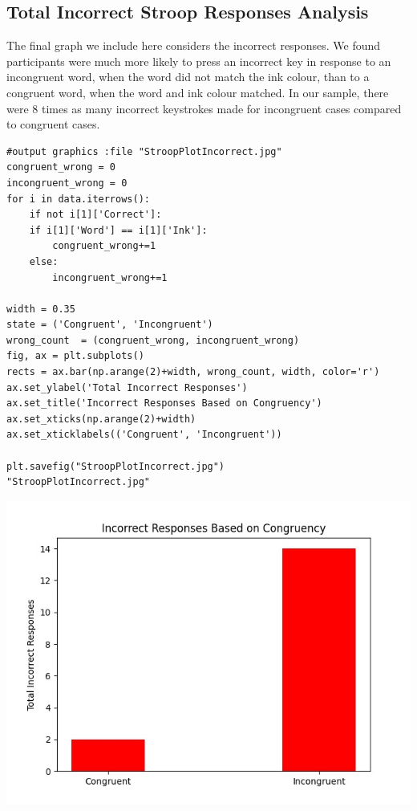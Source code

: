 \documentclass{article}
\begin{document}
\pagebreak


\subsection{Total Incorrect Stroop Responses Analysis}
\label{sec:org4ce073f}

The final graph we include here considers the incorrect responses. We found participants were much more likely to press an incorrect key in response to an incongruent word, when the word did not match the ink colour, than to a congruent word, when the word and ink colour matched. In our sample, there were 8 times as many incorrect keystrokes made for incongruent cases compared to congruent cases.

\begin{verbatim}
#output graphics :file "StroopPlotIncorrect.jpg"
congruent_wrong = 0
incongruent_wrong = 0
for i in data.iterrows():
    if not i[1]['Correct']:
	if i[1]['Word'] == i[1]['Ink']:
	    congruent_wrong+=1
	else:
	    incongruent_wrong+=1

width = 0.35
state = ('Congruent', 'Incongruent')
wrong_count  = (congruent_wrong, incongruent_wrong)
fig, ax = plt.subplots()
rects = ax.bar(np.arange(2)+width, wrong_count, width, color='r')
ax.set_ylabel('Total Incorrect Responses')
ax.set_title('Incorrect Responses Based on Congruency')
ax.set_xticks(np.arange(2)+width)
ax.set_xticklabels(('Congruent', 'Incongruent'))

plt.savefig("StroopPlotIncorrect.jpg")
"StroopPlotIncorrect.jpg"
\end{verbatim}

\begin{center}
\includegraphics[width=.9\linewidth]{StroopPlotIncorrect.jpg}
\end{center}
\end{document}
